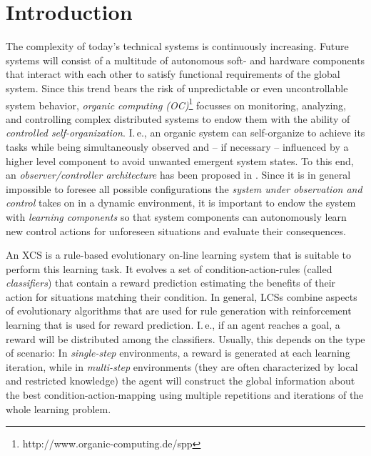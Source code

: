 \section{Introduction}
\label{section:introduction}

The complexity of today's technical systems is continuously increasing. Future systems will consist of a multitude of autonomous soft- and hardware components that interact with each other to satisfy functional requirements of the global system. Since this trend bears the risk of unpredictable or even uncontrollable system behavior, \emph{organic computing (OC)}\footnote{http://www.organic-computing.de/spp} %
focusses on monitoring, analyzing, and controlling complex distributed systems to endow them with the ability of \emph{controlled self-organization}. I.\,e., an or\-ga\-nic system can self-organize to achieve its tasks while being simultaneously observed and -- if necessary -- influenced by a higher level component to avoid unwanted emergent system states. To this end, an \emph{observer/controller architecture} has been proposed in \cite{RMB+06}. %
Since it is in general impossible to foresee all possible configurations the \emph{system under observation and control} takes on in a dynamic environment, it is important to endow the system with \emph{learning components} so that system components can autonomously learn new control actions for unforeseen situations and evaluate their consequences.

An XCS \cite{Wil95} is a rule-based evolutionary on-line learning system that is suitable to perform this learning task. It evolves a set of condition-action-rules (called \emph{classifiers}) that contain a reward prediction estimating the benefits of their action for situations matching their condition. In general, LCSs combine aspects of evolutionary algorithms that are used for rule generation with reinforcement learning that is used for reward prediction. I.\,e., if an agent reaches a goal, a reward will be distributed among the classifiers. Usually, this depends on the type of scenario: In \emph{single-step} environments, a reward is generated at each learning iteration, while in \emph{multi-step} environments (they are often characterized by local and restricted knowledge) the agent will construct the global information about the best condition-action-mapping using multiple repetitions and iterations of the whole learning problem.

